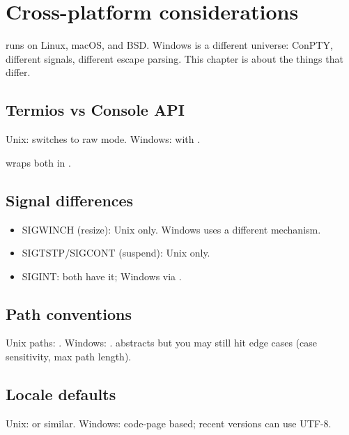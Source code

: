 \chapter{Cross-platform considerations}
\label{ch:crossplat2}

\begin{aside}
\maya{} runs on Linux, macOS, and BSD. Windows is a different
universe: ConPTY, different signals, different escape parsing.
This chapter is about the things that differ.
\end{aside}

\section{Termios vs Console API}

Unix:  switches to raw mode. Windows:
 with .

\maya{} wraps both in .

\section{Signal differences}

\begin{itemize}[leftmargin=*]
  \item SIGWINCH (resize): Unix only. Windows uses a
    different mechanism.
  \item SIGTSTP/SIGCONT (suspend): Unix only.
  \item SIGINT: both have it; Windows via
    .
\end{itemize}

\section{Path conventions}

Unix paths: . Windows: .
 abstracts but you may still
hit edge cases (case sensitivity, max path length).

\section{Locale defaults}

Unix:  or similar. Windows: code-page
based; recent versions can use UTF-8.

